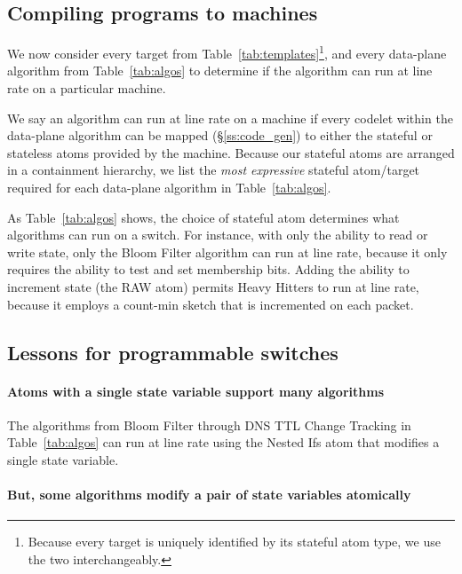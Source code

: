 \subsection{Compiling \pktlanguage programs to \absmachine machines}
\label{ss:compiler}
We now consider every target from Table~\ref{tab:templates}\footnote{Because
every target is uniquely identified by its stateful atom type, we use the two
interchangeably.}, and every data-plane algorithm from Table~\ref{tab:algos} to
determine if the algorithm can run at line rate on a particular \absmachine
machine.

We say an algorithm can run at line rate on a \absmachine machine if every
codelet within the data-plane algorithm can be mapped (\S\ref{ss:code_gen}) to
either the stateful or stateless atoms provided by the \absmachine machine.
Because our stateful atoms are arranged in a containment hierarchy, we list the
\textit{most expressive} stateful atom/target required for each data-plane
algorithm in Table~\ref{tab:algos}.

As Table~\ref{tab:algos} shows, the choice of stateful atom determines
 what algorithms can run on a switch. For instance, with only the
ability to read or write state, only the Bloom Filter algorithm can run at line
rate, because it only requires the ability to test and set membership bits.
Adding the ability to increment state (the RAW atom) permits Heavy
Hitters to run at line rate, because it employs a count-min sketch that is
incremented on each packet.

\subsection{Lessons for programmable switches}
\label{ss:lessons}
\paragraph{Atoms with a single state variable support many algorithms}

The algorithms from Bloom Filter through DNS TTL Change Tracking
in Table~\ref{tab:algos} can run at line rate using the Nested Ifs atom that
modifies a single state variable.

\paragraph{But, some algorithms modify a pair of state variables atomically}

